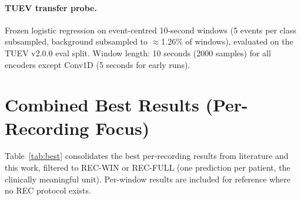 \documentclass[11pt,a4paper]{article}
\begin{document}
\paragraph{TUEV transfer probe.}
Frozen logistic regression on event-centred 10-second windows (5 events per class subsampled,
background subsampled to $\approx$1.26\% of windows), evaluated on the TUEV v2.0.0 eval split.
Window length: 10 seconds (2000 samples) for all encoders except Conv1D (5 seconds for early runs).

\section{Combined Best Results (Per-Recording Focus)}
\label{sec:best}

Table~\ref{tab:best} consolidates the best per-recording results from literature and this work,
filtered to REC-WIN or REC-FULL (one prediction per patient, the clinically meaningful unit).
Per-window results are included for reference where no REC protocol exists.
\end{document}
